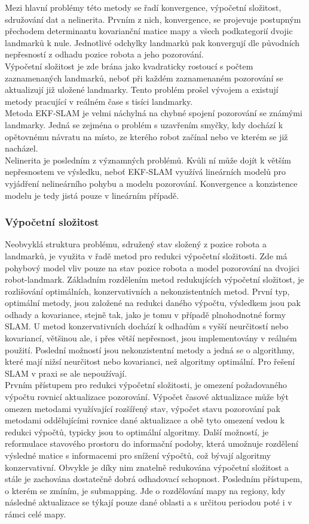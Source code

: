 \documentclass[12pt]{article}
\begin{document}
Mezi hlavní problémy této metody se řadí konvergence, výpočetní složitost, sdružování dat a nelinerita. Prvním z nich, konvergence, se projevuje postupným přechodem determinantu kovarianční matice mapy a všech podkategorií dvojic landmarků k nule. Jednotlivé odchylky landmarků pak konvergují dle původních nepřesností z odhadu pozice robota a jeho pozorování.\\
\indent Výpočetní složitost je zde brána jako kvadraticky rostoucí s počtem zaznamenaných landmarků, neboť při každém zaznamenaném pozorování se aktualizují již uložené landmarky. Tento problém prošel vývojem a existují metody pracující v reálném čase s tisíci landmarky.\\
\indent Metoda EKF-SLAM je velmi náchylná na chybné spojení pozorování se známými landmarky. Jedná se zejména o problém s uzavřením smyčky, kdy dochází k opětovnému návratu na místo, ze kterého robot začínal nebo ve kterém se již nacházel.\\
\indent Nelinerita je posledním z významných problémů. Kvůli ní může dojít k větším nepřesnostem ve výsledku, neboť EKF-SLAM využívá lineárních modelů pro vyjádření nelineárního pohybu a modelu pozorování. Konvergence a konzistence modelu je tedy jistá pouze v lineárním případě. 

\subsubsection{Výpočetní složitost}
Neobvyklá struktura problému, sdružený stav složený z pozice robota a landmarků, je využita v řadě metod pro redukci výpočetní složitosti. Zde má pohybový model vliv pouze na stav pozice robota a model pozorování na dvojici robot-landmark. Základním rozdělením metod redukujících výpočetní složitost, je rozlišování optimálních, konzervativních a nekonzistentních metod. První typ, optimální metody, jsou založené na redukci daného výpočtu, výsledkem jsou pak odhady a kovariance, stejně tak, jako je tomu v případě plnohodnotné formy SLAM. U metod konzervativních dochází k odhadům s vyšší neurčitostí nebo kovariancí, většinou ale, i přes větší nepřesnost, jsou implementovány v reálném použití. Poslední možností jsou nekonzistentní metody a jedná se o algorithmy, které mají nižsí neurčitost nebo kovarianci, než algoritmy optimální. Pro řešení SLAM v praxi se ale nepoužívají.\\
\indent Prvním přístupem pro redukci výpočetní složitosti, je omezení požadovaného výpočtu rovnicí aktualizace pozorování. Výpočet časové aktualizace může být omezen metodami využívající rozšířený stav, výpočet stavu pozorování pak metodami oddělujícími rovnice dané aktualizace a obě tyto omezení vedou k redukci výpočtů, typicky jsou to optimální algoritmy. Další možností, je reformulace stavového prostoru do informační podoby, která umožnuje rozdělení výsledné matice s informacemi pro snížení výpočtů, což bývají algoritmy konzervativní. Obvykle je díky nim znatelně redukována výpočetní složitost a stále je zachována dostatečně dobrá odhadovací schopnost. Posledním přístupem, o kterém se zmíním, je submapping. Jde o rozdělování mapy na regiony, kdy následné aktualizace se týkají pouze dané oblasti a s určitou periodou poté i v rámci celé mapy. 
\end{document}
